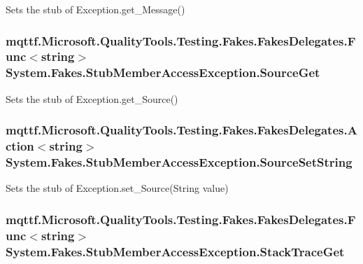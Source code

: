 Sets the stub of Exception.\-get\-\_\-\-Message()

\hypertarget{class_system_1_1_fakes_1_1_stub_member_access_exception_a3b75e960fdc65a728fc43912a289285e}{
\subsubsection[{Source\-Get}]{\setlength{\rightskip}{0pt plus 5cm}mqttf.\-Microsoft.\-Quality\-Tools.\-Testing.\-Fakes.\-Fakes\-Delegates.\-Func$<$string$>$ System.\-Fakes.\-Stub\-Member\-Access\-Exception.\-Source\-Get}}\label{class_system_1_1_fakes_1_1_stub_member_access_exception_a3b75e960fdc65a728fc43912a289285e}


Sets the stub of Exception.\-get\-\_\-\-Source()

\hypertarget{class_system_1_1_fakes_1_1_stub_member_access_exception_a8f49f8f0ece4c21258b4d50f57f32c30}{
\subsubsection[{Source\-Set\-String}]{\setlength{\rightskip}{0pt plus 5cm}mqttf.\-Microsoft.\-Quality\-Tools.\-Testing.\-Fakes.\-Fakes\-Delegates.\-Action$<$string$>$ System.\-Fakes.\-Stub\-Member\-Access\-Exception.\-Source\-Set\-String}}\label{class_system_1_1_fakes_1_1_stub_member_access_exception_a8f49f8f0ece4c21258b4d50f57f32c30}


Sets the stub of Exception.\-set\-\_\-\-Source(\-String value)

\hypertarget{class_system_1_1_fakes_1_1_stub_member_access_exception_ae3468428eec41d7e74ad247cc6270a3b}{
\subsubsection[{Stack\-Trace\-Get}]{\setlength{\rightskip}{0pt plus 5cm}mqttf.\-Microsoft.\-Quality\-Tools.\-Testing.\-Fakes.\-Fakes\-Delegates.\-Func$<$string$>$ System.\-Fakes.\-Stub\-Member\-Access\-Exception.\-Stack\-Trace\-Get}}\label{class_system_1_1_fakes_1_1_stub_member_access_exception_ae3468428eec41d7e74ad247cc6270a3b}



